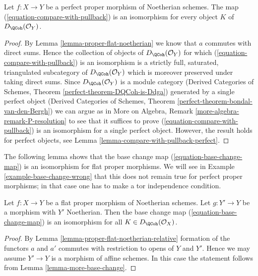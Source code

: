 \begin{lemma}
\label{lemma-compare-with-pullback-flat-proper-noetherian}
Let $f : X \to Y$ be a perfect proper morphism of Noetherian
schemes. The map (\ref{equation-compare-with-pullback}) is an isomorphism
for every object $K$ of $D_\QCoh(\mathcal{O}_Y)$.
\end{lemma}

\begin{proof}
By Lemma \ref{lemma-proper-flat-noetherian} we know that $a$ commutes
with direct sums. Hence the collection of objects of
$D_\QCoh(\mathcal{O}_Y)$ for which (\ref{equation-compare-with-pullback})
is an isomorphism is a strictly full, saturated, triangulated
subcategory of $D_\QCoh(\mathcal{O}_Y)$ which is moreover
preserved under taking direct sums. Since $D_\QCoh(\mathcal{O}_Y)$
is a module category (Derived Categories of Schemes, Theorem
\ref{perfect-theorem-DQCoh-is-Ddga}) generated by a single
perfect object (Derived Categories of Schemes, Theorem
\ref{perfect-theorem-bondal-van-den-Bergh})
we can argue as in
More on Algebra, Remark \ref{more-algebra-remark-P-resolution}
to see that it suffices to prove (\ref{equation-compare-with-pullback})
is an isomorphism for a single perfect object.
However, the result holds for perfect objects, see
Lemma \ref{lemma-compare-with-pullback-perfect}.
\end{proof}

\noindent
The following lemma shows that the base change map
(\ref{equation-base-change-map}) is an isomorphism
for flat proper morphisms. We will see in
Example \ref{example-base-change-wrong}
that this does not remain true for perfect proper morphisms;
in that case one has to make a tor independence condition.

\begin{lemma}
\label{lemma-proper-flat-base-change}
Let $f : X \to Y$ be a flat proper morphism of Noetherian schemes.
Let $g : Y' \to Y$ be a morphism with $Y'$ Noetherian. Then the base
change map (\ref{equation-base-change-map}) is an isomorphism
for all $K \in D_\QCoh(\mathcal{O}_X)$.
\end{lemma}

\begin{proof}
By Lemma \ref{lemma-proper-flat-noetherian-relative} formation of the
functors $a$ and $a'$ commutes with restriction to opens of $Y$ and $Y'$.
Hence we may assume $Y' \to Y$ is a morphism of affine schemes. In this
case the statement follows from Lemma \ref{lemma-more-base-change}.
\end{proof}

